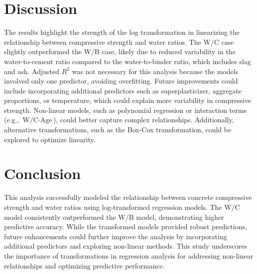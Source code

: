 \documentclass[a4paper,11pt]{article}
\begin{document}
\section*{Discussion}
The results highlight the strength of the log transformation in linearizing the relationship between compressive strength and water ratios. The W/C case slightly outperformed the W/B case, likely due to reduced variability in the water-to-cement ratio compared to the water-to-binder ratio, which includes slag and ash. Adjusted \( R^2 \) was not necessary for this analysis because the models involved only one predictor, avoiding overfitting. Future improvements could include incorporating additional predictors such as superplasticizer, aggregate proportions, or temperature, which could explain more variability in compressive strength. Non-linear models, such as polynomial regression or interaction terms (e.g., \( \text{W/C} \cdot \text{Age} \)), could better capture complex relationships. Additionally, alternative transformations, such as the Box-Cox transformation, could be explored to optimize linearity.

\section*{Conclusion}
This analysis successfully modeled the relationship between concrete compressive strength and water ratios using log-transformed regression models. The W/C model consistently outperformed the W/B model, demonstrating higher predictive accuracy. While the transformed models provided robust predictions, future enhancements could further improve the analysis by incorporating additional predictors and exploring non-linear methods. This study underscores the importance of transformations in regression analysis for addressing non-linear relationships and optimizing predictive performance.

\usepackage{xcolor}
\usepackage{mdframed}
\end{document}
